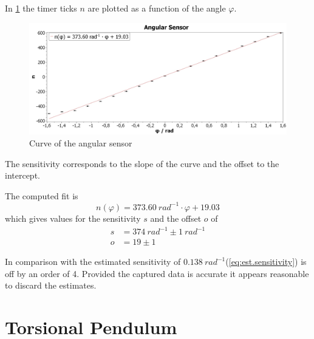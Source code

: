         In \cref{fig:angular-sensor} the timer ticks \(n\) are plotted as a function of the angle \(\varphi\).
        \begin{figure}[H]
            \centering
            \includegraphics[width=1\linewidth]{"messdaten/Angular Sensor"}
            \caption[Curve of the angular sensor]{Curve of the angular sensor}
            \label{fig:angular-sensor}
        \end{figure}
        The sensitivity corresponds to the slope of the curve and the offset to the intercept.\par
        The computed fit is
        \begin{equation}
            n(\varphi)=\SI{373.60}{rad^{-1}}\cdot\varphi +19.03
        \end{equation}
        which gives values for the sensitivity \( s \) and the offset \( o \) of
        \begin{align}
            s&=\SI{374}{rad^{-1}} \pm \SI{1}{rad^{-1}}\\
            o&=19 \pm 1
        \end{align}\par\medskip
        In comparison with the estimated sensitivity of \(\SI{0.138}{rad^{-1}}\)(\cref{eq:est.sensitivity}) is off by
        an order of 4. Provided the captured data is accurate it appears reasonable to discard the estimates.\par
    \section{Torsional Pendulum}
